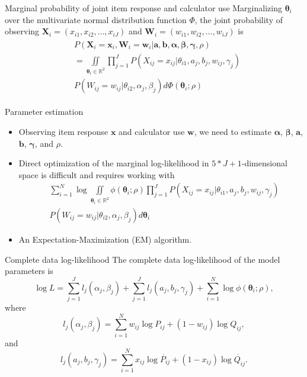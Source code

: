 \documentclass[xcolor=dvipsnames,12pt]{beamer}
\begin{document}
  \begin{frame}{Marginal probability of joint item response and calculator use}
    Marginalizing $\bm{\theta}_i$ over the multivariate normal distribution function $\Phi$, the joint probability of observing $\bm{X}_i = 
    (x_{i1}, x_{i2}, \dots, x_{iJ})$ and $\bm{W}_i = (w_{i1}, w_{i2}, \dots, w_
    {iJ})$ is
    \begin{gather}
    \begin{aligned}
      &P(\bm{X}_i = \bm{x}_i, \bm{W}_i = \bm{w}_i | \bm{a}, \bm{b}, \bm{\alpha}, 
      \bm{\beta}, \bm{\gamma}, \rho)\\ &= \iint \limits_{\bm{\theta}_i \in 
      \mathbb{R}^2} \prod_{j = 1}^{J} P(X_{ij} = x_{ij} | \theta_{i1}, a_j, b_j, w_{ij}, \gamma_j)\\ &P(W_{ij} = w_{ij} | \theta_{i2}, \alpha_j, \beta_j)d\Phi(\bm{\theta}_i;\rho)
    \end{aligned}
    \end{gather}
  \end{frame}

  \begin{frame}{Parameter estimation}
    \begin{itemize}
      \item Observing item response $\bm{x}$ and calculator use $\bm{w}$, we need to estimate $\bm{\alpha}$, $\bm{\beta}$, $\bm{a}$, $\bm{b}$, $\bm{\gamma}$, and $\rho$. 
      \item Direct optimization of the marginal log-likelihood in $5*J + 1$-dimensional space is difficult and requires working with 
      \begin{align*}
        &\sum_{i=1}^{N} \log \iint  \limits_{\bm{\theta}_i \in 
        \mathbb{R}^2} \phi(\bm{\theta}_i;\rho) \prod_{j = 1}^{J} P(X_{ij} = x_{ij} | \theta_{i1}, a_j, b_j, w_{ij}, \gamma_j)\\ &P(W_{ij} = w_{ij} | \theta_{i2}, \alpha_j, \beta_j)d\bm{\theta}_i
      \end{align*}
      \item An Expectation-Maximization (EM) algorithm.
    \end{itemize}
  \end{frame}

  \begin{frame}{Complete data log-likelihood}
    The complete data log-likelihood of the model parameters is
    \begin{equation}
      \log L = \sum_{j=1}^{J}l_j(\alpha_j, \beta_j) + \sum_{j=1}^{J}l_j(a_j,
      b_j,\gamma_j) + \sum_{i=1}^{N} \log \phi(\bm{\theta}_i;\rho),
    \end{equation}
    where
    \begin{equation}
      l_j(\alpha_j, \beta_j) = \sum_{i=1}^{N} w_{ij}\log P_{ij} + (1-w_{ij})\log
      Q_{ij},
    \end{equation}
    and
    \begin{equation}
      l_j(a_j,b_j,\gamma_j) = \sum_{i=1}^{N} x_{ij}\log \dot{P_{ij}} + (1-x_
      {ij})\log \dot{Q_{ij}}.
    \end{equation}
  \end{frame}
\end{document}
